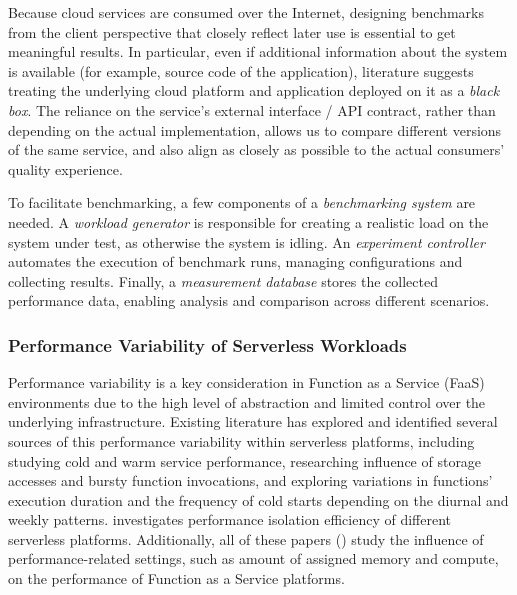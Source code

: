 Because cloud services are consumed over the Internet, designing benchmarks from the client perspective that closely reflect later use is essential to get meaningful results. In particular, even if additional information about the system is available (for example, source code of the application), literature \cite{bermbach2017cloud} suggests treating the underlying cloud platform and application deployed on it as a \emph{black box}. The reliance on the service's external interface / API contract, rather than depending on the actual implementation, allows us to compare different versions of the same service, and also align as closely as possible to the actual consumers' quality experience.

To facilitate benchmarking, a few components of a \emph{benchmarking system} are needed. A \emph{workload generator} is responsible for creating a realistic load on the system under test, as otherwise the system is idling. An \emph{experiment controller} automates the execution of benchmark runs, managing configurations and collecting results. Finally, a \emph{measurement database} stores the collected performance data, enabling analysis and comparison across different scenarios.


\subsubsection{Performance Variability of Serverless Workloads}
\label{sec:performance-variability}

Performance variability is a key consideration in Function as a Service (FaaS) environments due to the high level of abstraction and limited control over the underlying infrastructure. Existing literature has explored and identified several sources of this performance variability within serverless platforms, including \cite{lloyd2018serverless} studying cold and warm service performance, \cite{ustiugov2021analyzing} researching influence of storage accesses and bursty function invocations, and \cite{schirmer2023night} exploring variations in functions' execution duration and the frequency of cold starts depending on the diurnal and weekly patterns. \cite{wang2018peeking} investigates performance isolation efficiency of different serverless platforms. Additionally, all of these papers (\cite{lloyd2018serverless,ustiugov2021analyzing,schirmer2023night,wang2018peeking}) study the influence of performance-related settings, such as amount of assigned memory and compute, on the performance of Function as a Service platforms.

